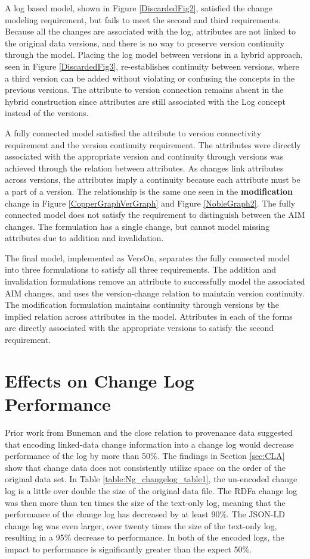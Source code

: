 A log based model, shown in Figure \ref{DiscardedFig2}, satisfied the change modeling requirement, but fails to meet the second and third requirements.
Because all the changes are associated with the log, attributes are not linked to the original data versions, and there is no way to preserve version continuity through the model.
Placing the log model between versions in a hybrid approach, seen in Figure \ref{DiscardedFig3}, re-establishes continuity between versions, where a third version can be added without violating or confusing the concepts in the previous versions.
The attribute to version connection remains absent in the hybrid construction since attributes are still associated with the Log concept instead of the versions.

A fully connected model satisfied the attribute to version connectivity requirement and the version continuity requirement.
The attributes were directly associated with the appropriate version and continuity through versions was achieved through the relation between attributes.
As changes link attributes across versions, the attributes imply a continuity because each attribute must be a part of a version.
The relationship is the same one seen in the \textbf{modification} change in Figure \ref{CopperGraphVerGraph} and Figure \ref{NobleGraph2}.
The fully connected model does not satisfy the requirement to distinguish between the \gls{AIM} changes.
The formulation has a single change, but cannot model missing attributes due to addition and invalidation.

The final model, implemented as VersOn, separates the fully connected model into three formulations to satisfy all three requirements.
The addition and invalidation formulations remove an attribute to successfully model the associated \gls{AIM} changes, and uses the version-change relation to maintain version continuity.
The modification formulation maintains continuity through versions by the implied relation across attributes in the model.
Attributes in each of the forms are directly associated with the appropriate versions to satisfy the second requirement.

\section{Effects on Change Log Performance}

Prior work from Buneman \cite{Buneman} and the close relation to provenance data suggested that encoding linked-data change information into a change log would decrease performance of the log by more than 50\%.
The findings in Section \ref{sec:CLA} show that change data does not consistently utilize space on the order of the original data set.
In Table \ref{table:Ng_changelog_table1}, the un-encoded change log is a little over double the size of the original data file.
The RDFa change log was then more than ten times the size of the text-only log, meaning that the performance of the change log has decreased by at least 90\%.
The JSON-LD change log was even larger, over twenty times the size of the text-only log, resulting in a 95\% decrease to performance.
In both of the encoded logs, the impact to performance is significantly greater than the expect 50\%.

